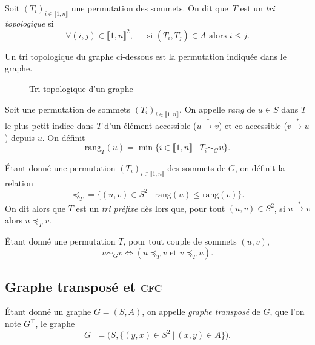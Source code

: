 \begin{defn}
	Soit $(T_i)_{i\in\llbracket 1,n \rrbracket}$\/ une permutation des sommets. On dit que~$T$\/ est un \textit{tri topologique} si \[
		\forall (i,j) \in \llbracket 1,n \rrbracket^2,\: \quad \text{ si }(T_i, T_j) \in A \text{ alors } i \le j
	.\]
\end{defn}

\begin{exm}
	Un tri topologique du graphe ci-dessous est la permutation indiquée dans le graphe.
	\begin{figure}[H]
		\centering
		\caption{Tri topologique d'un graphe}
	\end{figure}
\end{exm}

\begin{defn}
	Soit une permutation de sommets $(T_i)_{i\in\llbracket 1,n \rrbracket}$. On appelle \textit{rang} de $u \in S$\/ dans $T$\/ le plus petit indice dans $T$\/ d'un élément accessible ($u\xrightarrow{*} v$) et co-accessible ($v\xrightarrow{*} u$) depuis $u$. On définit \[
		\mathrm{rang}_T(u) = \min \{i \in \llbracket 1,n \rrbracket  \mid T_i \sim_G u\}
	.\]
\end{defn}

\begin{defn}
	Étant donné une permutation $(T_i)_{i\in\llbracket 1,n \rrbracket}$\/ des sommets de $G$,
	on définit la relation \[
		{\preceq_T} = \{(u,v) \in S^2 \mid \mathrm{rang}(u) \le \mathrm{rang}(v)\}
	.\] On dit alors que $T$\/ est un \textit{tri préfixe} dès lors que, pour tout $(u,v) \in S^2$, si $u \xrightarrow{*} v$\/ alors $u \preceq_T v$.
\end{defn}

\begin{rmk}
	Étant donné une permutation $T$, pour tout couple de sommets $(u,v)$, \[
		u \sim_G v \iff (u \preceq_T v \text{ et } v \preceq_T u)
	.\]
\end{rmk}

\subsection{Graphe transposé et \textsc{cfc}}

\begin{defn}
	Étant donné un graphe $G = (S, A)$, on appelle \textit{graphe  transposé} de $G$, que l'on note $G^\top$, le graphe \[
		G^\top = \Big(S, \big\{(y,x) \in S^2 \:\big|\: (x,y) \in A\big\}\Big)
	.\]
\end{defn}

